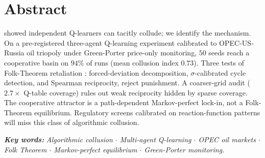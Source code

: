 \thispagestyle{empty}
\clearpage

\section*{Abstract}

\citet{calvano2020} showed independent Q-learners can tacitly collude;
we identify the mechanism. On a pre-registered three-agent Q-learning
experiment calibrated to OPEC-US-Russia oil triopoly under
Green-Porter price-only monitoring, $50$ seeds reach a cooperative basin
on $94\%$ of runs (mean collusion index $0.73$). Three tests of
Folk-Theorem retaliation : forced-deviation decomposition,
$\sigma$-calibrated cycle detection, and Spearman reciprocity, reject
punishment. A coarser-grid audit ($2.7\times$ Q-table coverage) rules
out weak reciprocity hidden by sparse coverage. The cooperative attractor
is a path-dependent Markov-perfect lock-in, not a Folk-Theorem
equilibrium. Regulatory screens calibrated on reaction-function patterns
will miss this class of algorithmic collusion.

\medskip
\noindent\textbf{\textit{Key words:}}
\textit{Algorithmic collusion $\cdot$ Multi-agent Q-learning $\cdot$ OPEC oil markets
$\cdot$ Folk Theorem $\cdot$ Markov-perfect equilibrium $\cdot$ 
Green-Porter monitoring.}

\clearpage
\tableofcontents
\clearpage
